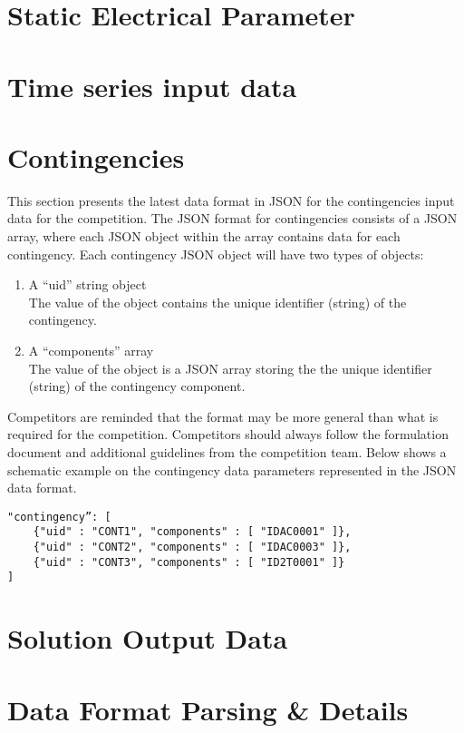 \documentclass{article}
\begin{document}
\section{Static Electrical Parameter}
\label{sec:format_spec}



\section{Time series input data}


\section{Contingencies}
\label{sec:contingency}
This section presents the latest data format in JSON for the contingencies input data for the competition.
The JSON format for contingencies consists of a JSON array,
where each JSON object within the array contains data for each contingency.
Each contingency JSON object will have two types of objects:
\begin{enumerate}
    \item A ``uid'' string object \\
    The value of the object contains the unique identifier (string) of the contingency.
    \item A ``components'' array \\
    The value of the object is a JSON array storing the the unique identifier (string) of the contingency component.
\end{enumerate}
Competitors are reminded that the format may be more general than
what is required for the competition.
Competitors should always
follow the formulation document and additional guidelines from the competition team.
Below shows a schematic example on the contingency data parameters represented in the JSON data format.
\begin{verbatim}
"contingency”: [
    {"uid" : "CONT1", "components" : [ "IDAC0001" ]},
    {"uid" : "CONT2", "components" : [ "IDAC0003" ]},
    {"uid" : "CONT3", "components" : [ "ID2T0001" ]}
]
\end{verbatim}



\section{Solution Output Data}


\section{Data Format Parsing \& Details}

\end{document}
